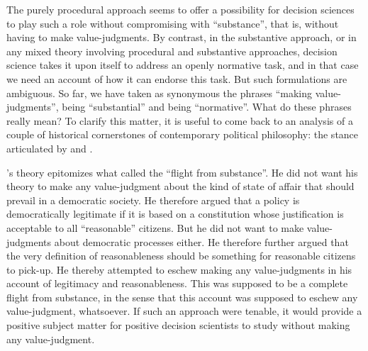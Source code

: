 \documentclass[preprint, french, english, 11pt]{elsarticle}%
\begin{document}
The purely procedural approach seems to offer a possibility for decision sciences to play such a role without compromising with ``substance'', that is, without having to make value-judgments. By contrast, in the substantive approach, or in any mixed theory involving procedural and substantive approaches, decision science takes it upon itself to address an openly normative task, and in that case we need an account of how it can endorse this task.
But such formulations are ambiguous. So far, we have taken as synonymous the phrases ``making value-judgments'', being ``substantial'' and being ``normative''. What do these phrases really mean? To clarify this matter, it is useful to come back to an analysis of a couple of historical cornerstones of contemporary political philosophy: the stance articulated by \cite{rawls_political_2005} and \cite{habermas_moralbewustsein_1983}.

\cite{rawls_political_2005}'s theory epitomizes what \cite{estlund_democratic_2009} called the ``flight from substance''. He did not want his theory to make any value-judgment about the kind of state of affair that should prevail in a democratic society. He therefore argued that a policy is democratically legitimate if it is based on a constitution whose justification is acceptable to all ``reasonable'' citizens. But he did not want to make value-judgments about democratic processes either. He therefore further argued that the very definition of reasonableness should be something for reasonable citizens to pick-up. He thereby attempted to eschew making any value-judgments in his account of legitimacy and reasonableness. This was supposed to be a complete flight from substance, in the sense that this account was supposed to eschew any value-judgment, whatsoever. If such an approach were tenable, it would provide a positive subject matter for positive decision scientists to study without making any value-judgment.
\end{document}

